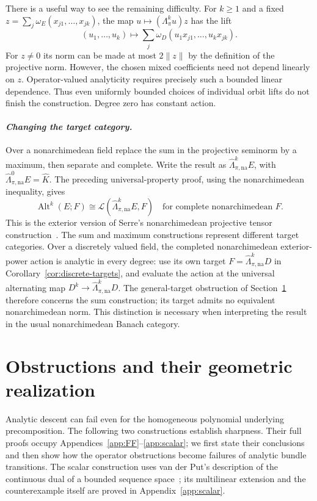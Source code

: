 \documentclass[11pt]{amsart}
\theoremstyle{definition}
\theoremstyle{remark}
\numberwithin{equation}{section}
\newcommand{\cL}{\mathcal L}
\newcommand{\Alt}{\operatorname{Alt}}
\newcommand{\norm}[1]{\lVert #1\rVert}
\begin{document}
There is a useful way to see the remaining difficulty. For $k\ge1$ and a fixed
$z=\sum_j\omega_E(x_{j1},\ldots,x_{jk})$, the map $u\mapsto(\Lambda^k_\pi u)z$ has the lift
\[
 (u_1,\ldots,u_k)\longmapsto
       \sum_j\omega_D(u_1x_{j1},\ldots,u_kx_{jk}).
\]
For $z\ne0$ its norm can be made at most $2\norm z$ by the definition of the projective norm.
However, the chosen mixed coefficients need not depend linearly on $z$. Operator-valued analyticity
requires precisely such a bounded linear dependence. Thus even uniformly bounded choices of individual
orbit lifts do not finish the construction. Degree zero has constant action.

\paragraph{\textit{Changing the target category.}}
Over a nonarchimedean field replace the sum in the projective seminorm by a maximum, then separate
and complete. Write the result as $\widehat\Lambda^k_{\pi,\mathrm{na}}E$, with
$\widehat\Lambda^0_{\pi,\mathrm{na}}E=\widehat K$. The preceding universal-property proof, using the
nonarchimedean inequality, gives
\[
 \Alt^k(E;F)\cong\cL(\widehat\Lambda^k_{\pi,\mathrm{na}}E,F)
 \quad\text{for complete nonarchimedean }F.
\]
This is the exterior version of Serre's nonarchimedean projective tensor construction~\cite[\S4]{Se}.
The sum and maximum constructions represent different target categories.
Over a discretely valued field, the completed nonarchimedean exterior-power action is analytic in every
degree: use its own target $F=\widehat\Lambda^k_{\pi,\mathrm{na}}D$ in
Corollary~\ref{cor:discrete-targets}, and evaluate the action at the universal alternating map $D^k\to\widehat\Lambda^k_{\pi,\mathrm{na}}D$.
The general-target obstruction of Section~\ref{sec:sharpness} therefore concerns the sum construction;
its target admits no equivalent nonarchimedean norm. This distinction is necessary when interpreting
the result in the usual nonarchimedean Banach category.

\section{Obstructions and their geometric realization}\label{sec:sharpness}

Analytic descent can fail even for the homogeneous polynomial underlying precomposition. The following
two constructions establish sharpness. Their full proofs occupy
Appendices~\ref{app:FF}--\ref{app:scalar}; we first state their conclusions and then show how the
operator obstructions become failures of analytic bundle transitions. The scalar construction uses
van der Put's description of the continuous dual of a bounded sequence space~\cite{VdP}; its
multilinear extension and the counterexample itself are proved in Appendix~\ref{app:scalar}.
\end{document}
